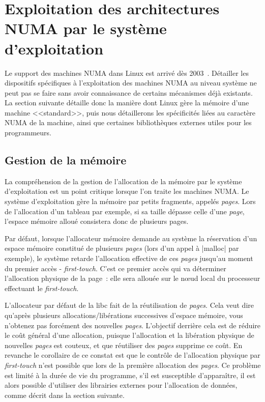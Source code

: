 \section{Exploitation des architectures NUMA par le système d'exploitation}\label{sec:context:os}

Le support des machines NUMA dans Linux est arrivé dès 2003~\cite{Dobson2003}.
Détailler les dispositifs spécifiques à l'exploitation des machines NUMA au niveau système ne peut pas se faire sans avoir connaissance de certains mécanismes déjà existants.
La section suivante détaille donc la manière dont Linux gère la mémoire d'une machine <<standard>>, puis nous détaillerons les spécificités liées au caractère NUMA de la machine, ainsi que certaines bibliothèques externes utiles pour les programmeurs.

\subsection{Gestion de la mémoire}

La compréhension de la gestion de l'allocation de la mémoire par le système d'exploitation est un point critique lorsque l'on traite les machines NUMA.
Le système d'exploitation gère la mémoire par petits fragments, appelés \emph{pages}.
Lors de l'allocation d'un tableau par exemple, si sa taille dépasse celle d'une \emph{page}, l'espace mémoire alloué consistera donc de plusieurs pages.


Par défaut, lorsque l'allocateur mémoire demande au système la réservation d'un espace mémoire constitué de plusieurs \emph{pages} (lors d'un appel à |malloc| par exemple), le système retarde l'allocation effective de ces \emph{pages} jusqu'au moment du premier accès - \emph{first-touch}.
C'est ce premier accès qui va déterminer l'allocation physique de la page~: elle sera allouée sur le nœud local du processeur effectuant le \emph{first-touch}.

L'allocateur par défaut de la libc fait de la réutilisation de \emph{pages}. Cela veut dire qu'après plusieurs allocations/libérations successives d'espace mémoire, vous n'obtenez pas forcément des nouvelles \emph{pages}.
L'objectif derrière cela est de réduire le coût général d'une allocation, puisque l'allocation et la libération physique de nouvelles \emph{pages} est couteux, et que réutiliser des \emph{pages} supprime ce coût.
En revanche le corollaire de ce constat est que le contrôle de l'allocation physique par \emph{first-touch} n'est possible que lors de la première allocation des \emph{pages}.
Ce problème est limité à la durée de vie du programme, s'il est susceptible d'apparaître, il est alors possible d'utiliser des librairies externes pour l'allocation de données, comme décrit dans la section suivante.

